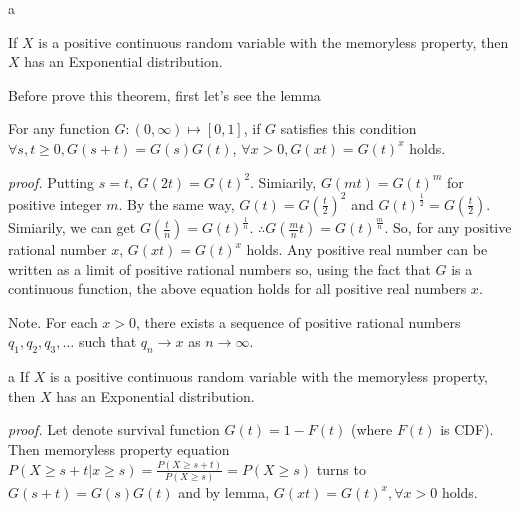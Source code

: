 \documentclass[8pt]{beamer}
\newcommand{\ti}[1]{\textit{#1}}
\begin{document}
\begin{frame}{a}

    \begin{theorem}
        If $X$ is a positive continuous random variable with the memoryless property, then $X$ has an Exponential distribution.
    \end{theorem}
    
    Before prove this theorem, first let's see the lemma

    \begin{lemma}
        For any function $G: (0, \infty) \mapsto [0,1]$, if $G$ satisfies this condition $\forall s,t\geq 0, G(s+t) = G(s)G(t)$, $\forall x >0, G(xt) = G(t)^x$ holds.
    \end{lemma}

    \ti{proof.} Putting $s = t$, $G(2t) = G(t)^2$. Simiarily, $G(mt) = G(t)^m$ for positive integer $m$. By the same way, $G(t) = G(\frac{t}{2})^2$ and $G(t)^{\frac{1}{2}} = G(\frac{t}{2})$. Simiarily, we can get $G(\frac{t}{n}) = G(t)^{\frac{1}{n}}$.
    $\therefore G(\frac{m}{n} t) = G(t)^\frac{m}{n}$. So, for any positive rational number $x$, $G(xt) = G(t)^x$ holds. Any positive real number can be written as a limit of positive rational numbers so, using the fact that $G$ is a continuous function, the above equation holds for all positive real numbers $x$.

    \bigskip
    Note. For each $x > 0$, there exists a sequence of positive rational numbers $q_1, q_2, q_3, \dots$ such that $q_n \rightarrow x$ as $n \rightarrow \infty$.
\end{frame}

\begin{frame}{a}
If $X$ is a positive continuous random variable with the memoryless property, then $X$ has an Exponential distribution.

\bigskip
\textit{proof.}
Let denote survival function $G(t) = 1- F(t)$ (where $F(t)$ is CDF). Then memoryless property equation $P(X \geq s+t | x\geq s) = \frac{P(X \geq s+t)}{P(X \geq s)} = P(X\geq s)$ turns to $G(s+t) = G(s)G(t)$ and by lemma, $G(xt) = G(t)^x, \forall x >0$ holds.
\end{frame}
\end{document}
